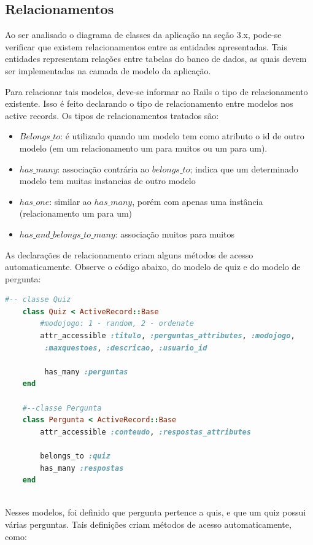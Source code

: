     \subsection{Relacionamentos}
     
            Ao ser analisado o diagrama de classes da aplicação na seção 3.x, pode-se verificar que existem relacionamentos entre as entidades apresentadas. Tais entidades representam relações entre tabelas do banco de dados, as quais devem ser implementadas na camada de modelo da aplicação.
			
            Para relacionar tais modelos, deve-se informar ao Rails o tipo de relacionamento existente. Isso é feito declarando o tipo de relacionamento entre modelos nos active records. Os tipos de relacionamentos tratados são:
			
\begin{itemize}
\item $Belongs\_to$: é utilizado quando um modelo tem como atributo o id de outro modelo (em um relacionamento um para muitos ou um para um).
\item $has\_many$: associação contrária ao $belongs\_to$; indica que um determinado modelo tem muitas instancias de outro modelo
\item $has\_one$: similar ao $has\_many$, porém com apenas uma instância (relacionamento um para um)
\item $has\_and\_belongs\_to\_many$: associação muitos para muitos
\end{itemize}     

    As declarações de relacionamento criam alguns métodos de acesso automaticamente. Observe o código abaixo, do modelo de quiz e do modelo de pergunta:
	
\begin{lstlisting}[language=Ruby]
    #-- classe Quiz
    class Quiz < ActiveRecord::Base
      	#modojogo: 1 - random, 2 - ordenate
    	attr_accessible :titulo, :perguntas_attributes, :modojogo,
		 :maxquestoes, :descricao, :usuario_id
     
    	 has_many :perguntas
    end
     
    #--classe Pergunta
    class Pergunta < ActiveRecord::Base
    	attr_accessible :conteudo, :respostas_attributes
     
    	belongs_to :quiz
    	has_many :respostas
    end
	
\end{lstlisting}

    Nesses modelos, foi definido que pergunta pertence a quis, e que um quiz possui várias perguntas. Tais definições criam métodos de acesso automaticamente, como:
	
